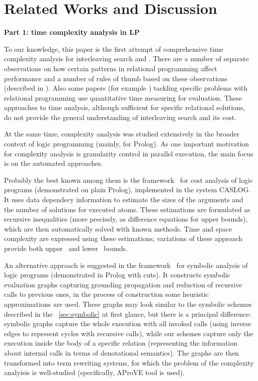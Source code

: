 \section{Related Works and Discussion}
\label{sec:discussion}

\colorbox{yellow!20}{\textbf{Part 1: time complexity analysis in LP}}

To our knowledge, this paper is the first attempt of comprehensive time complexity analysis for interleaving search and \mK.
There are a number of separate observations on how certain patterns in relational programming affect performance and a number of rules of thumb based on these observations (described in \cite{WillsThesis}).
Also some papers (for example \cite{GuardedFresh, FloatArithmetics, UniversalQuantification}) tackling specific problems with relational programming use quantitative time measuring for evaluation.
These approaches to time analysis, although sufficient for specific relational solutions, do not provide the general understanding of interleaving search and its cost.

At the same time, complexity analysis was studied extensively in the broader context of logic programming (mainly, for Prolog).
As one important motivation for complexity analysis is granularity control in parallel execution, the main focus is on the automated approaches.

Probably the best known among them is the framework~\cite{CostAnalysisLP} for cost analysis of logic programs (demonstrated on plain Prolog), implemented in the system CASLOG. It uses data dependecy information to estimate the sizes of the arguments and the number of solutions for executed atoms. These estimations are formulated as recursive inequalities (more precisely, as difference equations for upper bounds), which are then automatically solved with known methods. Time and space complexity are expressed using these estimations, variations of these approach provide both upper~\cite{CostAnalysisLP} and lower~\cite{CostAnalysisLPLower} bounds.

An alternative approach is suggested in the framework~\cite{SymbolicAnalysisLP} for symbolic analysis of logic programs (demonstrated in Prolog with cuts). It constructs symbolic evaluation graphs capturing grounding propagation and reduction of recursive calls to previous ones, in the process of construction some heuristic approximations are used. These graphs may look similar to the symbolic schemes described in the \sectionword~\ref{sec:symbolic} at first glance, but there is a principal difference: symbolic graphs capture the whole execution with all invoked calls (using inverse edges to represent cycles with recursive calls), while our schemes capture only the execution inside the body of a specific relation (representing the information about internal calls in terms of denotational semantics). The graphs are then transformed into term rewriting systems, for which the problem of the complexity analyisis is well-studied (specifically, AProVE tool is used).

